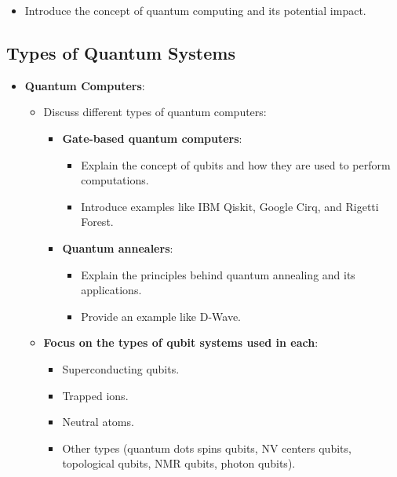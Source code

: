 \begin{itemize}
    \item Introduce the concept of quantum computing and its potential impact.
\end{itemize}

\subsection{Types of Quantum Systems}
\begin{itemize}
    \item \textbf{Quantum Computers}:
        \begin{itemize}
            \item Discuss different types of quantum computers:
                \begin{itemize}
                    \item \textbf{Gate-based quantum computers}: 
                        \begin{itemize}
                            \item Explain the concept of qubits and how they are used to perform computations.
                            \item Introduce examples like IBM Qiskit, Google Cirq, and Rigetti Forest.
                        \end{itemize}
                    \item \textbf{Quantum annealers}:
                        \begin{itemize}
                            \item Explain the principles behind quantum annealing and its applications.
                            \item Provide an example like D-Wave. 
                        \end{itemize}
                \end{itemize}
            \item \textbf{Focus on the types of qubit systems used in each}: 
                \begin{itemize}
                    \item Superconducting qubits.
                    \item Trapped ions.
                    \item Neutral atoms.
                    \item Other types (quantum dots spins qubits, NV centers qubits, topological qubits, NMR qubits, photon qubits).

\end{itemize}
\end{itemize}
\end{itemize}
